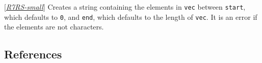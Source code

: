\begin{entry}{%
  }

  {[}\protect\hyperlink{R7RS-small}{\emph{R7RS-small}}{]} Creates a
  string containing the elements in \texttt{vec} between
  \texttt{start}, which defaults to \texttt{0}, and \texttt{end},
  which defaults to the length of \texttt{vec}. It is an error if the
  elements are not characters.
\end{entry}


\subsection{References}


